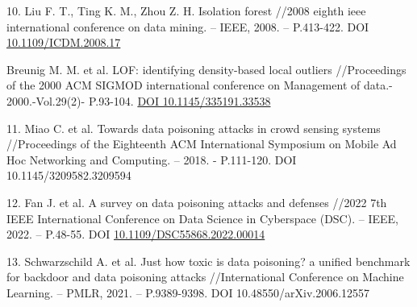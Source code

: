 \begin{references}
10. Liu F. T., Ting K. M., Zhou Z. H. Isolation forest //2008 eighth ieee
international conference on data mining. -- IEEE, 2008. -- P.413-422.
DOI \href{http://dx.doi.org/10.1109/ICDM.2008.17}{10.1109/ICDM.2008.17}

Breunig M. M. et al. LOF: identifying density-based local outliers
//Proceedings of the 2000 ACM SIGMOD international conference on
Management of data.- 2000.-Vol.29(2)- P.93-104.
\href{https://doi.org/10.1145/335191.335388}{DOI 10.1145/335191.33538}

11. Miao C. et al. Towards data poisoning attacks in crowd sensing
systems //Proceedings of the Eighteenth ACM International Symposium on
Mobile Ad Hoc Networking and Computing. -- 2018. - P.111-120. DOI
10.1145/3209582.3209594

12. Fan J. et al. A survey on data poisoning attacks and defenses //2022
7th IEEE International Conference on Data Science in Cyberspace (DSC).
-- IEEE, 2022. -- P.48-55. DOI
\href{http://dx.doi.org/10.1109/DSC55868.2022.00014}{10.1109/DSC55868.2022.00014}

13. Schwarzschild A. et al. Just how toxic is data poisoning? a unified
benchmark for backdoor and data poisoning attacks //International
Conference on Machine Learning. -- PMLR, 2021. -- P.9389-9398. DOI
10.48550/arXiv.2006.12557
\end{references}

